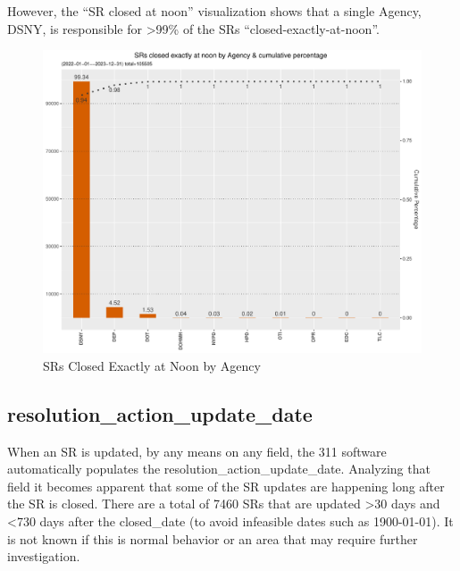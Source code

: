 \documentclass[12pt, titlepage]{article}
\begin{document}
However, the ``SR closed at noon'' visualization shows that  a single 
Agency, DSNY, is responsible for \textgreater99\% of the 
SRs ``closed-exactly-at-noon''. 
	
\begin{figure}[tbp]
	\centering
	\includegraphics[width = \textwidth]
	{closed_at_noon_chart.pdf}
	\caption{SRs Closed Exactly at Noon by Agency}
	\label{fig:noon-closed}
\end{figure}	
		
\subsection{resolution\_action\_update\_date}
\label{sec: resolutionaction}
When an SR is updated, by any means on any field, the 311 software 
automatically populates the resolution\_action\_update\_date. 
Analyzing that field it becomes apparent that some of the SR updates 
are happening long after the SR is closed. There are a 
total of 7460 SRs that are updated \textgreater30 days and \textless{}730 
days after the closed\_date (to avoid infeasible dates such as 1900-01-01).
It is not known if this is normal behavior or an area that may 
require further investigation. 
	
\end{document}
